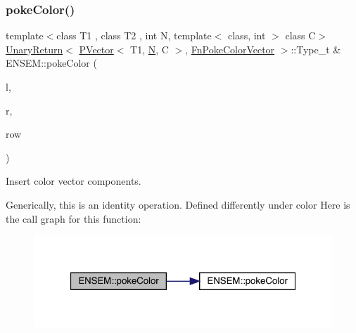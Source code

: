 \subsubsection{\texorpdfstring{pokeColor()}{pokeColor()}\hspace{0.1cm}{\footnotesize\ttfamily [1/2]}}
{\footnotesize\ttfamily template$<$class T1 , class T2 , int N, template$<$ class, int $>$ class C$>$ \\
\mbox{\hyperlink{structENSEM_1_1UnaryReturn}{Unary\+Return}}$<$ \mbox{\hyperlink{classENSEM_1_1PVector}{P\+Vector}}$<$ T1, \mbox{\hyperlink{operator__name__util_8cc_a7722c8ecbb62d99aee7ce68b1752f337}{N}}, C $>$, \mbox{\hyperlink{structENSEM_1_1FnPokeColorVector}{Fn\+Poke\+Color\+Vector}} $>$\+::Type\+\_\+t \& E\+N\+S\+E\+M\+::poke\+Color (\begin{DoxyParamCaption}\item[{\mbox{\hyperlink{classENSEM_1_1PVector}{P\+Vector}}$<$ T1, \mbox{\hyperlink{operator__name__util_8cc_a7722c8ecbb62d99aee7ce68b1752f337}{N}}, C $>$ \&}]{l,  }\item[{const \mbox{\hyperlink{classENSEM_1_1PVector}{P\+Vector}}$<$ T2, \mbox{\hyperlink{operator__name__util_8cc_a7722c8ecbb62d99aee7ce68b1752f337}{N}}, C $>$ \&}]{r,  }\item[{int}]{row }\end{DoxyParamCaption})\hspace{0.3cm}{\ttfamily [inline]}}



Insert color vector components. 

Generically, this is an identity operation. Defined differently under color Here is the call graph for this function\+:\nopagebreak
\begin{figure}[H]
\begin{center}
\leavevmode
\includegraphics[width=321pt]{d3/dc4/group__primvector_ga8643fc63839f4ef1bdbb168de2385c5e_cgraph}
\end{center}
\end{figure}
\mbox{\label{group__primvector_ga756245fd2f8bde2eab2ef42e08578af6}} 
